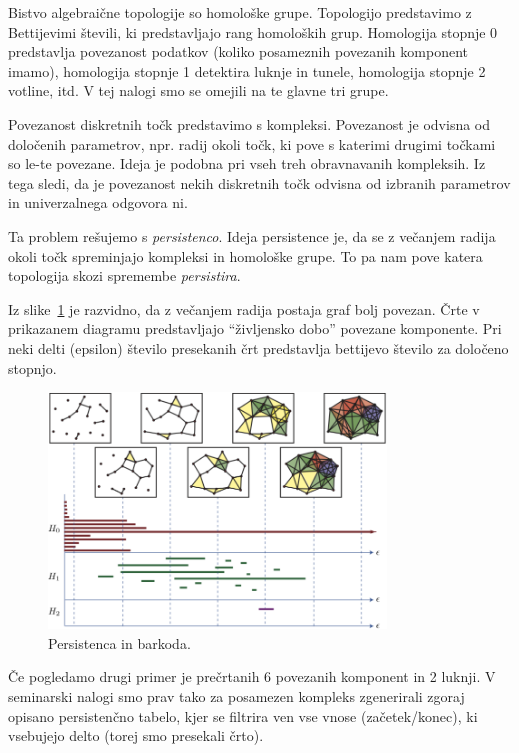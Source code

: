 \documentclass[11pt]{article}
\begin{document}
Bistvo algebraične topologije so homološke grupe. Topologijo predstavimo z Bettijevimi števili, ki predstavljajo rang homoloških grup. Homologija stopnje 0 predstavlja povezanost podatkov (koliko posameznih povezanih komponent imamo), homologija stopnje 1 detektira luknje in tunele, homologija stopnje 2 votline, itd. V tej nalogi smo se omejili na te glavne tri grupe. 

Povezanost diskretnih točk predstavimo s kompleksi. Povezanost je odvisna od določenih parametrov, npr. radij okoli točk, ki pove s katerimi drugimi točkami so le-te povezane. Ideja je podobna pri vseh treh obravnavanih kompleksih. Iz tega sledi, da je povezanost nekih diskretnih točk odvisna od izbranih parametrov in univerzalnega odgovora ni. 

Ta problem rešujemo s \emph{persistenco}. Ideja persistence je, da se z večanjem radija okoli točk spreminjajo kompleksi in homološke grupe. To pa nam pove katera topologija skozi spremembe \emph{persistira}.

Iz slike~\ref{homo} je razvidno, da z večanjem radija  postaja graf bolj povezan. Črte v prikazanem diagramu predstavljajo ``življensko dobo'' povezane komponente. Pri neki delti (epsilon) število presekanih črt predstavlja bettijevo število za določeno stopnjo.\cite{persist}

\begin{figure}[htb]
    \centering
    \includegraphics[width=0.8\textwidth]{homo.png}
    \caption{Persistenca in barkoda.}
    \label{homo}
\end{figure}

Če pogledamo drugi primer je prečrtanih 6 povezanih komponent in 2 luknji. V seminarski nalogi smo prav tako za posamezen kompleks zgenerirali zgoraj opisano persistenčno tabelo, kjer se filtrira ven vse vnose (začetek/konec), ki vsebujejo delto (torej smo presekali črto).
\end{document}
